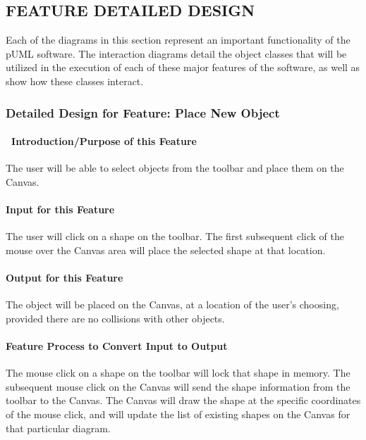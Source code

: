 \documentclass[twoside,letterpaper]{article}
\begin{document}
{\clearpage


\subsection[FEATURE DETAILED DESIGN]
{\bfseries\color{black} FEATURE DETAILED DESIGN}
{\color{black}
Each of the diagrams in this section represent an important functionality
of the pUML software.  The interaction diagrams detail the object classes
that will be utilized in the execution of each of these major features of
the software, as well as show how these classes interact.
}

\subsubsection{Detailed Design for Feature: Place New Object }

\paragraph[\ Introduction/Purpose of this Feature]
{\ Introduction/Purpose of this Feature}
{\color{black}
The user will be able to select objects from the toolbar and place them on the Canvas.
}

\paragraph[Input for this Feature]{Input for this Feature}
{\color{black}
The user will click on a shape on the toolbar.  The first subsequent click of the mouse over the Canvas area will place the selected shape at that location.
}

\paragraph{Output for this Feature}
{\color{black}
The object will be placed on the Canvas, at a location of the user{\textquoteright}s choosing, provided there are no collisions with other objects.
}

\paragraph{Feature Process to Convert Input to Output}
{\color{black}
The mouse click on a shape on the toolbar will lock that shape in memory.
The subsequent mouse click on the Canvas will send the shape information from the toolbar to the Canvas.  
The Canvas will draw the shape at the specific coordinates of the mouse click, and will update the list of existing shapes on the Canvas for that particular diagram.
}

}
\end{document}
